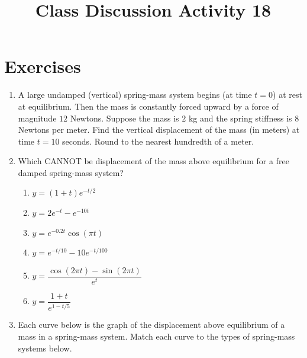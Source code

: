 \documentclass{ximera}
\begin{document}
\begin{abstract}
 \end{abstract}

    \title{Class Discussion Activity 18}
    
    \maketitle

\section*{Exercises}

\begin{enumerate}[label=(\arabic*)]


\item A large undamped (vertical) spring-mass system begins (at time $t=0$) at rest at equilibrium.  Then the mass is constantly forced upward by a force of magnitude $12$ Newtons.  Suppose the mass is $2$ kg and the spring stiffness is $8$ Newtons per meter.  Find the vertical displacement of the mass (in meters) at time $t=10$ seconds.  Round to the nearest hundredth of a meter.



\item Which CANNOT be displacement of the mass above equilibrium for a free damped spring-mass system?

\begin{enumerate}[label=(\alph*)]

\item $y=(1+t)e^{-t/2}$ 
\item $y=2e^{-t}-e^{-10t}$
\item $y=e^{-0.2t}\cos{(\pi t)}$
\item $y=e^{-t/10}-10e^{-t/100}$ 
\item $y=\dfrac{\cos{(2\pi t)}-\sin{(2\pi t)}}{e^{t}}$ 
\item $y=\dfrac{1+t}{e^{1-t/5}}$

\end{enumerate}


\newpage


\item Each curve below is the graph of the displacement above equilibrium of a mass in a spring-mass system.  Match each curve to the types of spring-mass systems below.


\end{enumerate}
\end{document}
